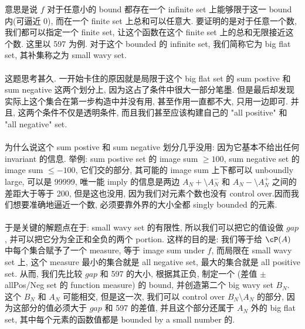 \documentclass[lang=cn,11pt]{elegantbook}
\begin{document}
\begin{remark}
    意思是说 $f$ 对于任意小的 bound 都存在一个 infinite set 上能够限于这一 bound 内(可逼近 0), 而在一个 finite set 上总和可以任意大. 要证明的是对于任意一个数, 我们都可以指定一个 finite set, 让这个函数在这个 finite set 上的总和无限接近这个数. 这里以 597 为例. 对于这个 bounded 的 infinite set, 我们简称它为 big flat set, 其补集称之为 small wavy set.\\\\
    这题思考甚久. 一开始卡住的原因就是局限于这个 big flat set 的 sum postive 和 sum negative 这两个划分上, 因为这占了条件中很大一部分笔墨. 但是最后却发现实际上这个集合在第一步构造中并没有用, 甚至作用一直都不大, 只用一边即可. 并且, 这两个条件不仅是透明条件, 而且我们甚至应该构建自己的 "all positive" 和 "all negative" set.\\\\
    为什么说这个 sum postive 和 sum negative 划分几乎没用: 因为它基本不给出任何 invariant 的信息. 举例: sum postive set 的 image sum $\geq 100$, sum negative set 的 image sum $\leq -100$, 它们交的部分, 其可能的 image sum 上下都可以 unboundly large, 可以是 99999, 唯一能 imply 的信息是两边 $A_N+ \setminus A_N^-$ 和 $A_N- \setminus A_N^+$ 之间的差距大于等于 200, 但是这也没用, 因为我们对元素个数也没有 control over.因而我们想要准确地逼近一个数, 必须要靠外界的大小全都 singly bounded 的元素.\\\\
    于是关键的解题点在于: small wavy set 的有限性, 所以我们可以把它的值设做 $gap$, 并可以把它分为全正和全负的两个 portion. 这样的目的是: 我们等于给 $\cP(A)$ 中每个集合赋予了一个 measure, 等于 image sum under $f$, 而局限在 small wavy set 上, 这个 measure 最小的集合就是 all negative set, 最大的集合就是 all positive set. 从而, 我们先比较 $gap$ 和 597 的大小, 根据其正负, 制定一个 (差值 $\pm$ allPos/Neg set 的 function measure) 的 bound, 并创造第二个 big wavy set $B_N$. 这个 $B_N$ 和 $A_N$ 可能相交, 但是这一次, 我们可以 control over $B_N \setminus A_N$ 的部分, 因为这部分的值必须大于 $gap$ 和 597 的差值, 并且这个部分还属于 $A_N$ 外的 big flat set, 其中每个元素的函数值都是 bounded by a small number 的. 
\end{remark}
\end{document}
